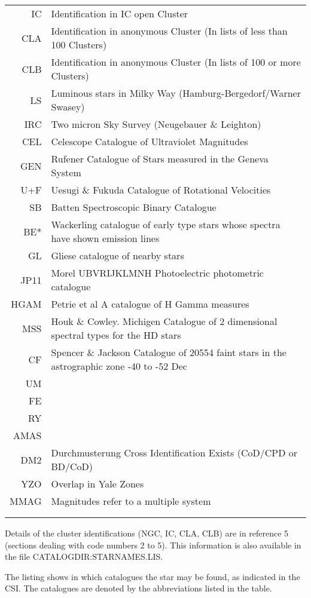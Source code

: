 \documentclass{article}
\begin{document}
\begin{tabular}{rl}
 IC   &  Identification in IC open Cluster\\
 CLA  &  Identification in anonymous Cluster
         (In lists of less than 100 Clusters)\\
 CLB  &  Identification in anonymous Cluster
         (In lists of 100 or more Clusters)\\
 LS   &  Luminous stars in Milky Way
         (Hamburg-Bergedorf/Warner Swasey)\\
 IRC  &  Two micron Sky Survey (Neugebauer \& Leighton)\\
 CEL  &  Celescope Catalogue of Ultraviolet Magnitudes\\
 GEN  &  Rufener Catalogue of Stars measured in the Geneva System\\
 U+F  &  Uesugi \& Fukuda Catalogue of Rotational Velocities\\
 SB   &  Batten Spectroscopic Binary Catalogue\\
 BE*  &  Wackerling catalogue of early type stars whose spectra
         have shown emission lines\\
  GL  &  Gliese catalogue of nearby stars\\
JP11  &  Morel UBVRIJKLMNH Photoelectric photometric catalogue\\
HGAM  &  Petrie et al A catalogue of H Gamma measures\\
 MSS  &  Houk \& Cowley. Michigen Catalogue of 2 dimensional
         spectral types for the HD stars\\
  CF  &  Spencer \& Jackson Catalogue of 20554 faint stars in the
         astrographic zone -40 to -52 Dec\\
  UM  & \\
  FE  & \\
  RY  & \\
AMAS  & \\
 DM2  &  Durchmusterung Cross Identification Exists
         (CoD/CPD or BD/CoD)\\
 YZO  &  Overlap in Yale Zones\\
MMAG  &  Magnitudes refer to a multiple system\\
& \\
& \\
\end{tabular}

Details of the cluster identifications (NGC, IC, CLA, CLB) are in reference 5
(sections dealing with code numbers 2 to 5).
This information is also available in the file CATALOGDIR:STARNAMES.LIS.

The listing shows in which catalogues the star may be found, as indicated in the
CSI.
The catalogues are denoted by the abbreviations listed in the table.
\end{document}
